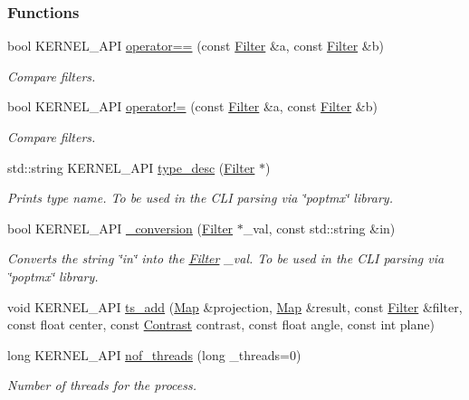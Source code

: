 \subsubsection*{Functions}
\begin{DoxyCompactItemize}
\item 
bool KERNEL\_\-API \hyperlink{group__CT_gaf9133142c6dad9960a265f4bed342f1e}{operator==} (const \hyperlink{classFilter}{Filter} \&a, const \hyperlink{classFilter}{Filter} \&b)
\begin{DoxyCompactList}\small\item\em Compare filters. \item\end{DoxyCompactList}\item 
bool KERNEL\_\-API \hyperlink{group__CT_ga006e30108fb1535d0038ebc54fa2fef0}{operator!=} (const \hyperlink{classFilter}{Filter} \&a, const \hyperlink{classFilter}{Filter} \&b)
\begin{DoxyCompactList}\small\item\em Compare filters. \item\end{DoxyCompactList}\item 
std::string KERNEL\_\-API \hyperlink{group__CT_gad97b803aaaa6ade957937bfcb55e9640}{type\_\-desc} (\hyperlink{classFilter}{Filter} $\ast$)
\begin{DoxyCompactList}\small\item\em Prints type name. To be used in the CLI parsing via \char`\"{}poptmx\char`\"{} library. \item\end{DoxyCompactList}\item 
bool KERNEL\_\-API \hyperlink{group__CT_ga1e87f9e83a0925d1e574f0ac072aa307}{\_\-conversion} (\hyperlink{classFilter}{Filter} $\ast$\_\-val, const std::string \&in)
\begin{DoxyCompactList}\small\item\em Converts the string \char`\"{}in\char`\"{} into the \hyperlink{classFilter}{Filter} \_\-val. To be used in the CLI parsing via \char`\"{}poptmx\char`\"{} library. \item\end{DoxyCompactList}\item 
void KERNEL\_\-API \hyperlink{group__CT_ga5808611b08d2e9151075e49b8d0722a0}{ts\_\-add} (\hyperlink{group__Types_ga8747378c016fc11d9ecbb98787248c25}{Map} \&projection, \hyperlink{group__Types_ga8747378c016fc11d9ecbb98787248c25}{Map} \&result, const \hyperlink{classFilter}{Filter} \&filter, const float center, const \hyperlink{classContrast}{Contrast} contrast, const float angle, const int plane)
\item 
long KERNEL\_\-API \hyperlink{group__CT_ga8ef1bda2c874aacbf35db98ebf624053}{nof\_\-threads} (long \_\-threads=0)
\begin{DoxyCompactList}\small\item\em Number of threads for the process. \item\end{DoxyCompactList}\end{DoxyCompactItemize}
